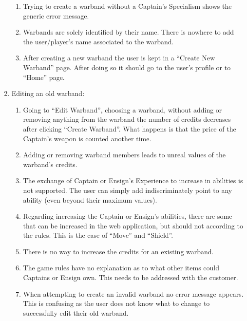 \documentclass[12pt,a4paper]{article}
\begin{document}
\begin{enumerate}
\begin{enumerate}
                             \item Trying to create a warband without a Captain's Specialism shows the generic error message.
                             \item Warbands are solely identified by their name. There is nowhere to add the user/player's name associated to the warband.
                             \item After creating a new warband the user is kept in a ``Create New Warband'' page. After doing so it should go to the user's profile or to ``Home'' page.
                            \end{enumerate}
 
 \item Editing an old warband:\begin{enumerate}
                               \item Going to ``Edit Warband'', choosing a warband, without adding or removing anything from the warband the number of credits decreases after clicking ``Create Warband''. What happens is that the price of the Captain's weapon is counted another time.
                               \item Adding or removing warband members leads to unreal values of the warband's credits.
                               \item The exchange of Captain or Ensign's Experience to increase in abilities is not supported. The user can simply add indiscriminately point to any ability (even beyond their maximum values).
                               \item Regarding increasing the Captain or Ensign's abilities, there are some that can be increased in the web application, but should not according to the rules. This is the case of ``Move'' and ``Shield''.
                               \item There is no way to increase the credits for an existing warband.
                               \item The game rules have no explanation as to what other items could Captains or Ensign own. This needs to be addressed with the customer. 
                               \item When attempting to create an invalid warband no error message appears. This is confusing as the user does not know what to change to successfully edit their old warband.
                              \end{enumerate}

 
\end{enumerate}
\end{document}
